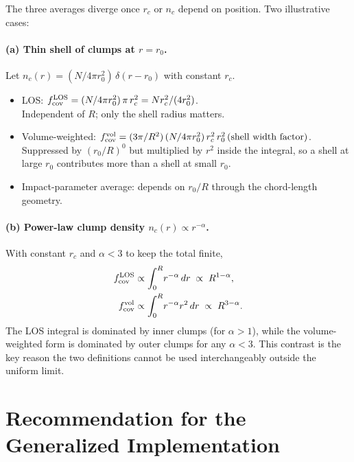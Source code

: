 \documentclass[english,a4paper]{my_memo}
\begin{document}
The three averages diverge once $r_c$ or $n_c$ depend on position.  Two
illustrative cases:

\paragraph{(a) Thin shell of clumps at $r=r_{0}$.}
Let $n_c(r) = (N/4\pi r_{0}^{2})\,\delta(r-r_{0})$ with constant $r_c$.

\begin{itemize}
\item LOS: $f_{\rm cov}^{\rm LOS} = (N/4\pi r_{0}^{2})\,\pi\,r_c^{2} = N r_c^{2}/(4 r_{0}^{2})$.\\
  Independent of $R$; only the shell radius matters.
\item Volume-weighted: $f_{\rm cov}^{\rm vol} = (3\pi/R^{2})\,(N/4\pi r_{0}^{2})\,r_c^{2}\,r_{0}^{2}\,(\text{shell width factor})$. \\
  Suppressed by $(r_{0}/R)^{0}$ but multiplied by $r^{2}$ inside the integral, so a shell at large $r_0$ contributes more than a shell at small $r_0$.
\item Impact-parameter average: depends on $r_{0}/R$ through the chord-length geometry.
\end{itemize}

\paragraph{(b) Power-law clump density $n_c(r)\propto r^{-\alpha}$.}
With constant $r_c$ and $\alpha<3$ to keep the total finite,
\begin{align}
   f_{\rm cov}^{\rm LOS}    &\propto \int_{0}^{R}\! r^{-\alpha}\,dr   \;\propto\; R^{1-\alpha}, \\
   f_{\rm cov}^{\rm vol}    &\propto \int_{0}^{R}\! r^{-\alpha}r^{2}\,dr \;\propto\; R^{3-\alpha}.
\end{align}
The LOS integral is dominated by inner clumps (for $\alpha>1$), while the
volume-weighted form is dominated by outer clumps for any $\alpha<3$.
This contrast is the key reason the two definitions cannot be used
interchangeably outside the uniform limit.

\section{Recommendation for the Generalized Implementation}
\end{document}
